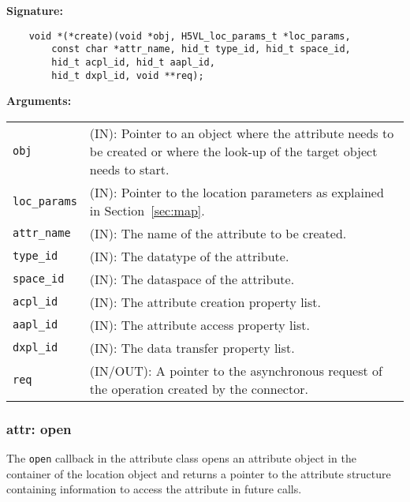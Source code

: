 \begin{mdframed}[style=bgbox]
\textbf{Signature:}
\begin{lstlisting}
    void *(*create)(void *obj, H5VL_loc_params_t *loc_params, 
        const char *attr_name, hid_t type_id, hid_t space_id,
        hid_t acpl_id, hid_t aapl_id, 
        hid_t dxpl_id, void **req);
\end{lstlisting}

\textbf{Arguments:}\\
\begin{tabular}{l p{13.5cm}}
  \texttt{obj} & (IN): Pointer to an object where the attribute needs
  to be created or where the look-up of the target object needs to
  start.\\
  \texttt{loc\_params} & (IN): Pointer to the location parameters as explained in
  Section~\ref{sec:map}.\\
  \texttt{attr\_name} & (IN): The name of the attribute to be created.\\
  \texttt{type\_id} & (IN): The datatype of the attribute.\\
  \texttt{space\_id} & (IN): The dataspace of the attribute.\\
  \texttt{acpl\_id} & (IN): The attribute creation property list.\\
  \texttt{aapl\_id} & (IN): The attribute access property list.\\
  \texttt{dxpl\_id} & (IN): The data transfer property list.\\
  \texttt{req} & (IN/OUT): A pointer to the asynchronous request of the
  operation created by the connector.\\
\end{tabular}
\end{mdframed}

\subsubsection{attr: open}
The \texttt{open} callback in the attribute class opens an
attribute object in the container of the location object and returns a
pointer to the attribute structure containing information to access
the attribute in future calls. \bigskip

